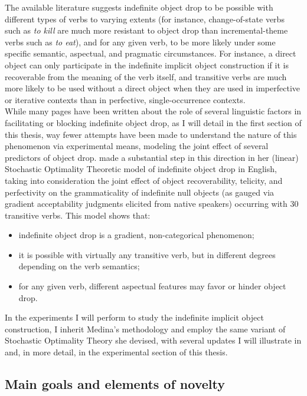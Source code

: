 The available literature suggests indefinite object drop to be possible with different types of verbs to varying extents (for instance, change-of-state verbs such as \textit{to kill} are much more resistant to object drop than incremental-theme verbs such as \textit{to eat}), and for any given verb, to be more likely under some specific semantic, aspectual, and pragmatic circumstances. For instance, a direct object can only participate in the indefinite implicit object construction if it is recoverable from the meaning of the verb itself, and transitive verbs are much more likely to be used without a direct object when they are used in imperfective or iterative contexts than in perfective, single-occurrence contexts.\\
While many pages have been written about the role of several linguistic factors in facilitating or blocking indefinite object drop, as I will detail in the first section of this thesis, way fewer attempts have been made to understand the nature of this phenomenon via experimental means, modeling the joint effect of several predictors of object drop. \textcite{Medina2007} made a substantial step in this direction in her (linear) Stochastic Optimality Theoretic model of indefinite object drop in English, taking into consideration the joint effect of object recoverability, telicity, and perfectivity on the grammaticality of indefinite null objects (as gauged via gradient acceptability judgments elicited from native speakers) occurring with 30 transitive verbs. This model shows that:
\begin{itemize}
    \item indefinite object drop is a gradient, non-categorical phenomenon;
    \item it is possible with virtually any transitive verb, but in different degrees depending on the verb semantics;
    \item for any given verb, different aspectual features may favor or hinder object drop.
\end{itemize}

In the experiments I will perform to study the indefinite implicit object construction, I inherit Medina's methodology and employ the same variant of Stochastic Optimality Theory she devised, with several updates I will illustrate in  and, in more detail, in the experimental section of this thesis.


\subsection{Main goals and elements of novelty} 

